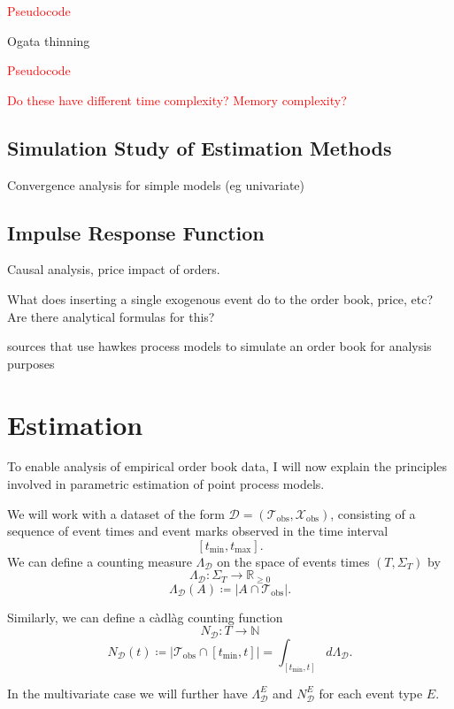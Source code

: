 \documentclass[honours,12pt]{unswthesis}
\numberwithin{equation}{section}
\begin{document}
\textcolor{red}{Pseudocode}

Ogata thinning 

\textcolor{red}{Pseudocode}

\textcolor{red}{Do these have different time complexity? Memory complexity?}

\section{Simulation Study of Estimation Methods}
Convergence analysis for simple models (eg univariate)

\section{Impulse Response Function}
Causal analysis, price impact of orders.

What does inserting a single exogenous event do to the order book, price, etc? Are there analytical formulas for this?


\cite{AbergelJedidi} \cite{Toke} sources that use hawkes process models to simulate an order book for analysis purposes

\chapter{Estimation}%

To enable analysis of empirical order book data, I will now explain the principles involved in parametric estimation of point process models.

We will work with a dataset of the form $\mathcal{D} = \left(\mathcal{T}_\mathrm{obs},\mathcal{X}_\mathrm{obs}\right)$, consisting of a sequence of event times and event marks observed in the time interval $$[t_\mathrm{min},t_\mathrm{max}].$$
We can define a counting measure $\Lambda_\mathcal{D}$ on the space of events times $(T,\Sigma_T)$ by
$$\Lambda_{\mathcal{D}} : \Sigma_T \to \mathbb{R}_{\geq 0}$$
$$\Lambda_{\mathcal{D}}(A) \coloneq \left\vert A\cap\mathcal{T}_\mathrm{obs}\right\vert.$$

Similarly, we can define a càdlàg counting function
$$N_\mathcal{D} : T \to \mathbb{N}$$
$$N_\mathcal{D}(t) \coloneq \left\vert \mathcal{T}_\mathrm{obs}\cap [t_\mathrm{min},t]\right\vert = \int_{[t_\mathrm{min},t]} d\Lambda_\mathcal{D}.$$

In the multivariate case we will further have $\Lambda_\mathcal{D}^E$ and $N_\mathcal{D}^E$ for each event type $E$.
\end{document}
